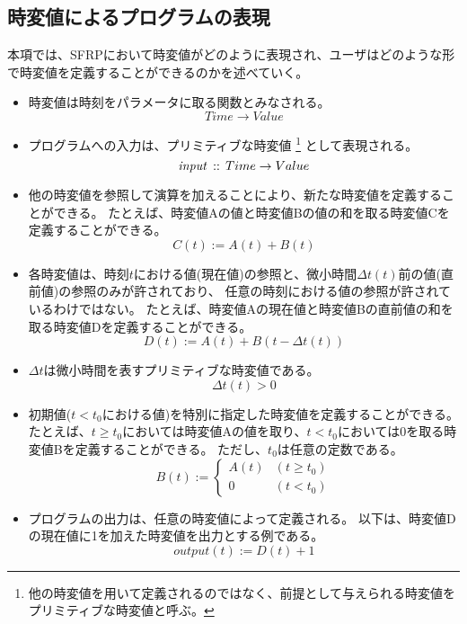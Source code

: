 \subsection{時変値によるプログラムの表現}\label{sec:language:model:program}
本項では、SFRPにおいて時変値がどのように表現され、ユーザはどのような形で時変値を定義することができるのかを述べていく。

\begin{itemize}
  \item
  時変値は時刻をパラメータに取る関数とみなされる。
  \begin{equation*}
    Time \rightarrow Value
  \end{equation*}

  \item
  プログラムへの入力は、プリミティブな時変値
  \footnote{他の時変値を用いて定義されるのではなく、前提として与えられる時変値をプリミティブな時変値と呼ぶ。}
  として表現される。
  \begin{equation*}
    {\it input} \, :: \, Time \rightarrow Value
  \end{equation*}

  \item
  他の時変値を参照して演算を加えることにより、新たな時変値を定義することができる。
  たとえば、時変値Aの値と時変値Bの値の和を取る時変値Cを定義することができる。
  \begin{equation*}
    C(t) := A(t) + B(t)
  \end{equation*}

  \item
  各時変値は、時刻$t$における値(現在値)の参照と、微小時間$ \Delta t(t) $前の値(直前値)の参照のみが許されており、
  任意の時刻における値の参照が許されているわけではない。
  たとえば、時変値Aの現在値と時変値Bの直前値の和を取る時変値Dを定義することができる。
  \begin{equation*}
    D(t) := A(t) + B(t - \Delta t(t))
  \end{equation*}

  \item
  $ \Delta t $は微小時間を表すプリミティブな時変値である。
  \begin{equation*}
    \Delta t(t) > 0
  \end{equation*}

  \item
  初期値($ t < t_0 $における値)を特別に指定した時変値を定義することができる。
  たとえば、$t \geq t_0$においては時変値Aの値を取り、$t < t_0$においては0を取る時変値Bを定義することができる。
  ただし、$t_0$は任意の定数である。
  \begin{equation*}
    B(t) := \begin{cases}
      A(t) & (t \geq t_0) \\
      0 & (t < t_0)
    \end{cases}
  \end{equation*}

  \item
  プログラムの出力は、任意の時変値によって定義される。
  以下は、時変値Dの現在値に1を加えた時変値を出力とする例である。
  \begin{equation*}
    output(t) := D(t) + 1
  \end{equation*}
\end{itemize}

